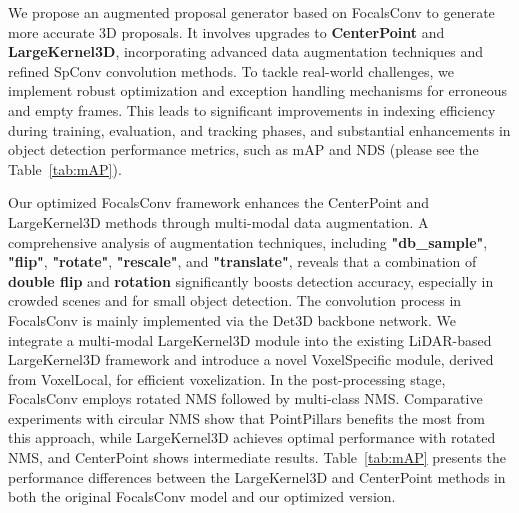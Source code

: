 We propose an augmented proposal generator based on FocalsConv to generate more accurate 3D proposals. It involves upgrades to \textbf{CenterPoint} and \textbf{LargeKernel3D}, incorporating advanced data augmentation techniques and refined SpConv convolution methods. To tackle real-world challenges, we implement robust optimization and exception handling mechanisms for erroneous and empty frames. This leads to significant improvements in indexing efficiency during training, evaluation, and tracking phases, and substantial enhancements in object detection performance metrics, such as mAP and NDS (please see the Table~\ref{tab:mAP}).

Our optimized FocalsConv framework enhances the CenterPoint and LargeKernel3D methods through multi-modal data augmentation. A comprehensive analysis of augmentation techniques, including \textbf{"db\_sample"}, \textbf{"flip"}, \textbf{"rotate"}, \textbf{"rescale"}, and \textbf{"translate"}, reveals that a combination of \textbf{double flip} and \textbf{rotation} significantly boosts detection accuracy, especially in crowded scenes and for small object detection. The convolution process in FocalsConv is mainly implemented via the Det3D backbone network. We integrate a multi-modal LargeKernel3D module into the existing LiDAR-based LargeKernel3D framework and introduce a novel VoxelSpecific module, derived from VoxelLocal, for efficient voxelization. In the post-processing stage, FocalsConv employs rotated NMS followed by multi-class NMS. Comparative experiments with circular NMS show that PointPillars benefits the most from this approach, while LargeKernel3D achieves optimal performance with rotated NMS, and CenterPoint shows intermediate results. Table~\ref{tab:mAP} presents the performance differences between the LargeKernel3D and CenterPoint methods in both the original FocalsConv model and our optimized version.


